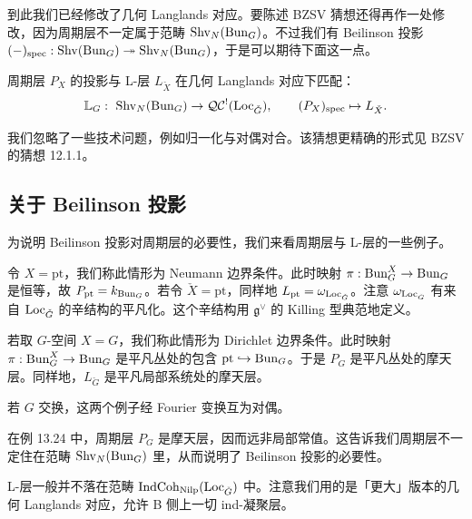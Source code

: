 到此我们已经修改了几何 Langlands 对应。要陈述 BZSV 猜想还得再作一处修改，因为周期层不一定属于范畴 $\operatorname{Shv}_N(\operatorname{Bun}_G)$。不过我们有 Beilinson 投影 $(-)_{\mathrm{spec}}:\operatorname{Shv}(\operatorname{Bun}_G)\twoheadrightarrow\operatorname{Shv}_N(\operatorname{Bun}_G)$，于是可以期待下面这一点。

\begin{conj}[整体几何猜想]
周期层 $P_X$ 的投影与 L-层 $L_{\check X}$ 在几何 Langlands 对应下匹配：
\[
  \mathbb L_G:\ \Shv_N(\Bun_G)\to\QC^!(\Loc_{\check G}),\qquad (P_X)_{\mathrm{spec}}\mapsto L_{\check X}.
\]
\end{conj}

\begin{rem}
我们忽略了一些技术问题，例如归一化与对偶对合。该猜想更精确的形式见 BZSV 的猜想 12.1.1。
\end{rem}

\subsection{关于 Beilinson 投影}

为说明 Beilinson 投影对周期层的必要性，我们来看周期层与 L-层的一些例子。

\begin{exmp}
令 $X=\mathrm{pt}$，我们称此情形为 Neumann 边界条件。此时映射 $\pi:\operatorname{Bun}^X_G\to\operatorname{Bun}_G$ 是恒等，故 $P_{\mathrm{pt}}=k_{\operatorname{Bun}_G}$。若令 $\check X=\mathrm{pt}$，同样地 $L_{\mathrm{pt}}=\omega_{\operatorname{Loc}_{\check G}}$。注意 $\omega_{\operatorname{Loc}_{\check G}}$ 有来自 $\operatorname{Loc}_{\check G}$ 的辛结构的平凡化。这个辛结构用 $\mathfrak g^\vee$ 的 Killing 型典范地定义。
\end{exmp}

\begin{exmp}
若取 $G$-空间 $X=G$，我们称此情形为 Dirichlet 边界条件。此时映射 $\pi:\operatorname{Bun}^X_G\to\operatorname{Bun}_G$ 是平凡丛处的包含 $\mathrm{pt}\hookrightarrow\operatorname{Bun}_G$。于是 $P_G$ 是平凡丛处的摩天层。同样地，$L_{\check G}$ 是平凡局部系统处的摩天层。
\end{exmp}

\begin{rem}
若 $G$ 交换，这两个例子经 Fourier 变换互为对偶。
\end{rem}

在例 13.24 中，周期层 $P_G$ 是摩天层，因而远非局部常值。这告诉我们周期层不一定住在范畴 $\operatorname{Shv}_N(\operatorname{Bun}_G)$ 里，从而说明了 Beilinson 投影的必要性。

\begin{rem}
L-层一般并不落在范畴 $\operatorname{IndCoh}_{\mathrm{Nilp}}(\operatorname{Loc}_{\check G})$ 中。注意我们用的是「更大」版本的几何 Langlands 对应，允许 B 侧上一切 ind-凝聚层。
\end{rem}

